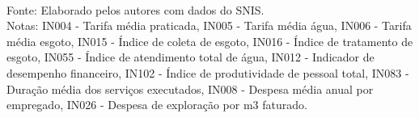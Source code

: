 

\begin{table}[H] \centering 
\begin{minipage}{1\textwidth}
  \caption{Estatístiscas descritivas dos indicadores utilizados - 2019} 
  \label{tab:desc1} 
  \tiny
\footnotesize \\
	Fonte: Elaborado pelos autores com dados do SNIS. \\
	Notas: IN004 - Tarifa média praticada,
	IN005 - Tarifa média água,
	IN006 - Tarifa média esgoto,		
	IN015 - Índice de coleta de esgoto,
	IN016 - Índice de tratamento de esgoto,
	IN055 - Índice de atendimento total de água,	
	IN012 - Indicador de desempenho financeiro,
	IN102 - Índice de produtividade de pessoal total,
	IN083 - Duração média dos serviços executados,	
	IN008 - Despesa média anual por empregado,
	IN026 - Despesa de exploração por m3 faturado.
\end{minipage}
\end{table} 











